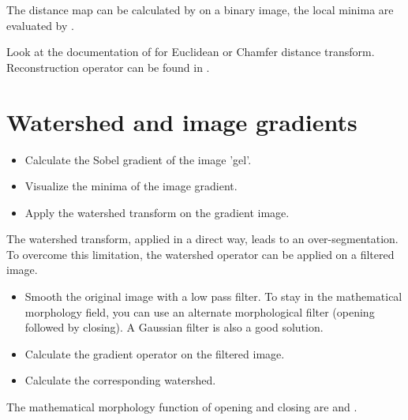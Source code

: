 \begin{mcomment}
\begin{mremark}
The distance map can be calculated by  on a binary image, the local minima are evaluated by .
\end{mremark}
\end{mcomment}

\begin{pcomment}
\begin{premark}
Look at the documentation of  for Euclidean or Chamfer distance transform. Reconstruction operator can be found in .
\end{premark}
\end{pcomment}



\section{Watershed and image gradients}
\begin{qbox}
\begin{itemize}
	\item Calculate the Sobel gradient of the image 'gel'.
	\item Visualize the minima of the image gradient.
    \item Apply the watershed transform on the gradient image.
\end{itemize}
\end{qbox}

\noindent The watershed transform, applied in a direct way, leads to an over-segmentation. To overcome this limitation, the watershed operator can be applied on a filtered image.

\begin{qbox}
\begin{itemize}
\item Smooth the original image with a low pass filter. To stay in the mathematical morphology field, you can use an alternate morphological filter (opening followed by closing). A Gaussian filter is also a good solution.
	\item Calculate the gradient operator on the filtered image.
	\item Calculate the corresponding watershed.
\end{itemize}
\end{qbox}

\begin{mcomment}
\begin{mremark}
The mathematical morphology function of opening and closing are  and .
\end{mremark}
\end{mcomment}

